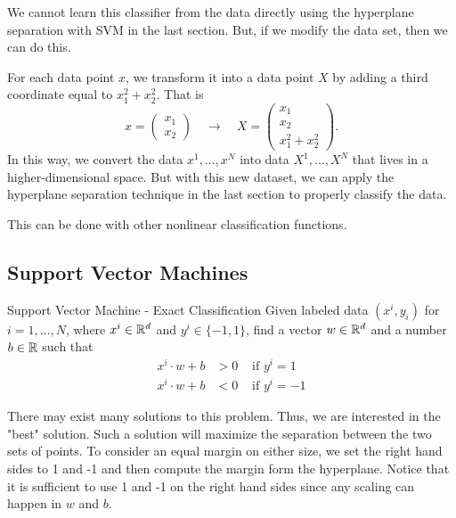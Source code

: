 \documentclass[../open-optimization/open-optimization.tex]{subfiles}
\begin{document}
We cannot learn this classifier from the data directly using the hyperplane separation with SVM in the last section.  But, if we modify the data set, then we can do this.  

For each data point $x$, we transform it into a data point $X$ by adding a third coordinate equal to $x_1^2 + x_2^2$.  That is 
\begin{equation}
x = \begin{pmatrix} x_1 \\ x_2 \end{pmatrix} \quad \rightarrow \quad X = \begin{pmatrix} x_1 \\ x_2 \\ x_1^2 + x_2^2 \end{pmatrix}.
\end{equation}
In this way, we convert the data $x^1, \dots, x^N$ into data $X^1, \dots, X^N$ that lives in a higher-dimensional space.  But with this new dataset, we can apply the hyperplane separation technique in the last section to properly classify the data.

This can be done with other nonlinear classification functions.  

\subsection{Support Vector Machines}

\begin{general}{Support Vector Machine - Exact Classification}{}
Given labeled data $(x^i, y_i)$ for $i=1, \dots, N$, where $x^i \in {\mathbb{R}}^d$ and $y^i \in \{-1,1\}$, find a vector $w \in {\mathbb{R}}^d$ and a number $b \in {\mathbb{R}}$ such that 
\begin{align}
x^i \cdot w + b & > 0  & \text{ if } y^i = 1\\
x^i \cdot w + b & < 0  & \text{ if } y^i = -1
\end{align}
\end{general}

There may exist many solutions to this problem.  Thus, we are interested in the "best" solution.  Such a solution will maximize the separation between the two sets of points.  To consider an equal margin on either size, we set the right hand sides to 1 and -1 and then compute the margin form the hyperplane.  Notice that it is sufficient to use 1 and -1 on the right hand sides since any scaling can happen in $w$ and $b$.
\end{document}
